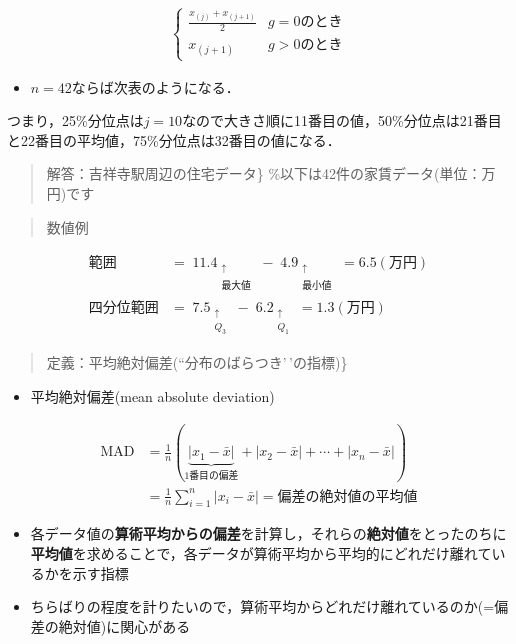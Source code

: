 \documentclass[
]{book}
\providecommand{\tightlist}{%
  \setlength{\itemsep}{0pt}\setlength{\parskip}{0pt}}
\theoremstyle{definition}
\theoremstyle{definition}
\theoremstyle{definition}
\theoremstyle{definition}
\theoremstyle{remark}
\begin{document}
\begin{align*}
\begin{cases}
\frac{x_{(j)}+x_{(j+1)}}{2} & g=0\text{のとき} \\
x_{(j+1)} & g>0\text{のとき}
\end{cases}
\end{align*}

\begin{itemize}
\tightlist
\item
  \(n=42\)ならば次表のようになる．
\end{itemize}

つまり，25\%分位点は\(j=10\)なので大きさ順に11番目の値，50\%分位点は21番目と22番目の平均値，75\%分位点は32番目の値になる．

\begin{quote}
解答：吉祥寺駅周辺の住宅データ\}
\%以下は42件の家賃データ(単位：万円)です
\end{quote}

\begin{quote}
数値例
\end{quote}

\begin{align*}
\text{範囲}
&=\mathop{11.4}_{\substack{\uparrow \\ \text{最大値}}}
-\mathop{4.9}_{\substack{\uparrow \\ \text{最小値}}}
=6.5(\text{万円}) \\
%
\text{四分位範囲}
&=\mathop{7.5}_{\substack{\uparrow \\ Q_3}}
-\mathop{6.2}_{\substack{\uparrow \\ Q_1}}
=1.3(\text{万円})
\end{align*}

\begin{quote}
定義：平均絶対偏差(``分布のばらつき'\,'の指標)\}
\end{quote}

\begin{itemize}
\tightlist
\item
  平均絶対偏差(mean absolute deviation)
\end{itemize}

\begin{align*}
\text{MAD}
&=\frac{1}{n}(\underbrace{|x_1-\bar{x}|}_{\text{1番目の偏差}}+|x_2-\bar{x}|+\cdots+|x_n-\bar{x}|) \\
&=\frac{1}{n} \sum_{i=1}^n |x_i-\bar{x}| 
=\text{偏差の絶対値の平均値}
\end{align*}

\begin{itemize}
\tightlist
\item
  各データ値の\textbf{算術平均からの偏差}を計算し，それらの\textbf{絶対値}をとったのちに\textbf{平均値}を求めることで，各データが算術平均から平均的にどれだけ離れているかを示す指標
\item
  ちらばりの程度を計りたいので，算術平均からどれだけ離れているのか(=偏差の絶対値)に関心がある
\end{itemize}
\end{document}
